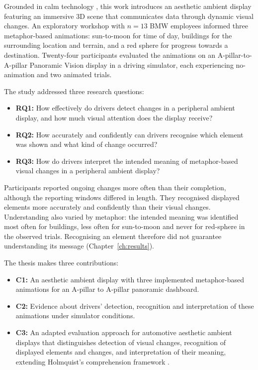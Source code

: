 \documentclass[
english,                 %
bibtex,                  %
includeExtraAbstracts, %
]{kththesis}
\numberwithin{listing}{chapter}
\begin{document}
Grounded in calm technology \cite{weiserDesigningCalmTechnology,bakkerDesignPeripheralInteraction2013}, this work introduces an aesthetic ambient display featuring an immersive 3D scene that communicates data through dynamic visual changes. An exploratory workshop with $n = 13$ BMW employees informed three metaphor-based animations: sun-to-moon for time of day, buildings for the surrounding location and terrain, and a red sphere for progress towards a destination. Twenty-four participants evaluated the animations on an A-pillar-to-A-pillar Panoramic Vision display in a driving simulator, each experiencing no-animation and two animated trials.

The study addressed three research questions:

\begin{itemize}
  \item \textbf{RQ1:} How effectively do drivers detect changes in a peripheral ambient display, and how much visual attention does the display receive?
  \item \textbf{RQ2:} How accurately and confidently can drivers recognise which element was shown and what kind of change occurred?
  \item \textbf{RQ3:} How do drivers interpret the intended meaning of metaphor-based visual changes in a peripheral ambient display?
\end{itemize}

Participants reported ongoing changes more often than their completion, although the reporting windows differed in length. They recognised displayed elements more accurately and confidently than their visual changes. Understanding also varied by metaphor: the intended meaning was identified most often for buildings, less often for sun-to-moon and never for red-sphere in the observed trials. Recognising an element therefore did not guarantee understanding its message (Chapter~\ref{ch:results}).

The thesis makes three contributions:

\begin{itemize}
  \item \textbf{C1:} An aesthetic ambient display with three implemented metaphor-based animations for an A-pillar to A-pillar panoramic dashboard.
  \item \textbf{C2:} Evidence about drivers' detection, recognition and interpretation of these animations under simulator conditions.
  \item \textbf{C3:} An adapted evaluation approach for automotive aesthetic ambient displays that distinguishes detection of visual changes, recognition of displayed elements and changes, and interpretation of their meaning, extending Holmquist's comprehension framework \cite{holmquistEvaluatingComprehensionAmbient2004}.
\end{itemize}
\end{document}
